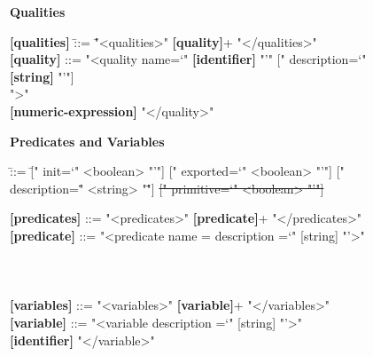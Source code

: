 \begin{figure}[hp!]
\begin{tcolorbox}[title=iStar-DT-X Grammar,colbacktitle=orange!40!white,coltitle=black,fonttitle=\bfseries,adjusted title=iStarDT-X Grammar (3/3),halign title=flush center]

\rmfamily
\begin{footnotesize}
\textbf{Qualities}
\end{footnotesize}
\ttfamily
\vspace{-3mm}

\begin{scriptsize}
\begin{tabbing}
\textbf{[qualities]} \= ::= \= "<qualities>" \textbf{[quality]}+ "</qualities>"\\
\textbf{[quality]} \> ::= "<quality name=`" \textbf{[identifier]} "'" [" description=`" \textbf{[string]} "'"] \\\>\> [" root=`" \textbf{[boolean]} "'"] ">" \\\>\> \textbf{[numeric-expression]} "</quality>"\\
\end{tabbing}


\vspace{-2mm}
\rmfamily
\begin{footnotesize}
\textbf{Predicates and Variables}
\end{footnotesize}
\ttfamily
\vspace{-3mm}

\begin{scriptsize}
\begin{tabbing}
[individualzzz] \= ::= \= [" init=`" <boolean> "'"] [" exported=`" <boolean> "'"] [" description=\"" <string> "\""] \sout{[" primitive=`" <boolean> "'"]} \kill

\textbf{[predicates]} \> ::= "<predicates>" \textbf{[predicate]}+ "</predicates>" \\
\textbf{[predicate]} \> ::= "<predicate name =  description =`" [string] "'>" \\ 
\>\> \\
 \>  \\ 
\>\> \\
\textbf{[variables]} \> ::= "<variables>" \textbf{[variable]}+ "</variables>" \\
\textbf{[variable]} \> ::= "<variable description =`" [string] "'>" \\ \>\> \textbf{[identifier]} "</variable>"
\end{tabbing}
\end{scriptsize}



\end{scriptsize}
\end{tcolorbox}
\end{figure}
